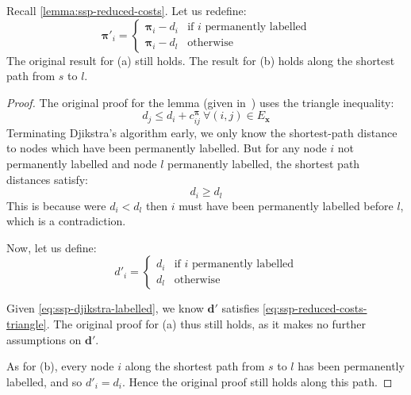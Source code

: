 \begin{lemma}
Recall \cref{lemma:ssp-reduced-costs}. Let us redefine:
{\normalfont
\[\boldsymbol{\pi}'_{i}=\begin{cases}
\boldsymbol{\pi}_{i}-d_{i} & \textrm{if $i$ permanently labelled}\\
\boldsymbol{\pi}_{i}-d_{l} & \textrm{otherwise}
\end{cases}\]}
The original result for (a) still holds. The result for (b) holds along the shortest path from $s$ to $l$\footnotemark.
\end{lemma}
\begin{proof}
The original proof for the lemma (given in~\cite[p.~320]{Ahuja:1993}) uses the triangle inequality:
\begin{equation} \label{eq:ssp-reduced-costs-triangle}
d_j \leq d_i + c^{\boldsymbol{\pi}}_{ij}\:\forall(i,j)\in E_{\mathbf{x}}
\end{equation}
Terminating Djikstra's algorithm early, we only know the shortest-path distance to nodes which have been permanently labelled. But for any node $i$ not permanently labelled and node $l$ permanently labelled, the shortest path distances satisfy:
\begin{equation} \label{eq:ssp-djikstra-labelled}
d_i \geq d_l
\end{equation}
This is because were $d_i < d_l$ then $i$ must have been permanently labelled before $l$, which is a contradiction.

Now, let us define: 
\begin{equation} \label{eq:ssp-djikstra-distances}
d'_{i}=\begin{cases}
d_{i} & \text{if $i$ permanently labelled}\\
d_{l} & \text{otherwise}
\end{cases}
\end{equation}

Given \cref{eq:ssp-djikstra-labelled}, we know $\mathbf{d}'$ satisfies \cref{eq:ssp-reduced-costs-triangle}. The original proof for (a) thus still holds, as it makes no further assumptions on $\mathbf{d}'$.

As for (b), every node $i$ along the shortest path from $s$ to $l$ has been permanently labelled, and so $d'_i = d_i$. Hence the original proof still holds along this path.
\end{proof}


